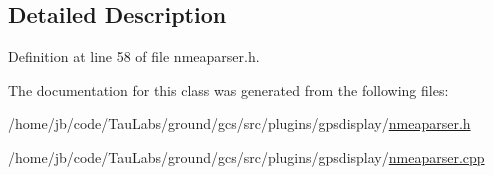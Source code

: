 \subsection{\-Detailed \-Description}


\-Definition at line 58 of file nmeaparser.\-h.



\-The documentation for this class was generated from the following files\-:\begin{DoxyCompactItemize}
\item 
/home/jb/code/\-Tau\-Labs/ground/gcs/src/plugins/gpsdisplay/\hyperlink{nmeaparser_8h}{nmeaparser.\-h}\item 
/home/jb/code/\-Tau\-Labs/ground/gcs/src/plugins/gpsdisplay/\hyperlink{nmeaparser_8cpp}{nmeaparser.\-cpp}\end{DoxyCompactItemize}
